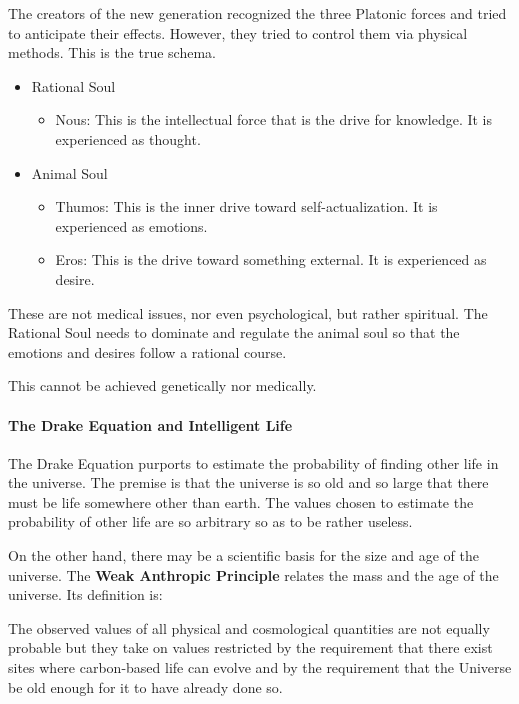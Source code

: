 The creators of the new generation recognized the three Platonic forces and tried to anticipate their effects. However, they tried to control them via physical methods. This is the true schema.

\begin{itemize}
\item Rational Soul
  \begin{itemize}
	\item Nous: This is the intellectual force that is the drive for knowledge. It is experienced as thought.
  \end{itemize}
\item Animal Soul
  \begin{itemize}
	\item Thumos: This is the inner drive toward self-actualization. It is experienced as emotions.
	\item Eros: This is the drive toward something external. It is experienced as desire.
\end{itemize}
\end{itemize}

These are not medical issues, nor even psychological, but rather spiritual. The Rational Soul needs to dominate and regulate the animal soul so that the emotions and desires follow a rational course.

This cannot be achieved genetically nor medically.

\paragraph{The Drake Equation and Intelligent Life}

The Drake Equation purports to estimate the probability of finding other life in the universe. The premise is that the universe is so old and so large that there must be life somewhere other than earth. The values chosen to estimate the probability of other life are so arbitrary so as to be rather useless.

On the other hand, there may be a scientific basis for the size and age of the universe. The \textbf{Weak Anthropic Principle} relates the mass and the age of the universe. Its definition is:

\begin{quotex}
The observed values of all physical and cosmological quantities are not equally probable but they take on values restricted by the requirement that there exist sites where carbon-based life can evolve and by the requirement that the Universe be old enough for it to have already done so.
\end{quotex}


